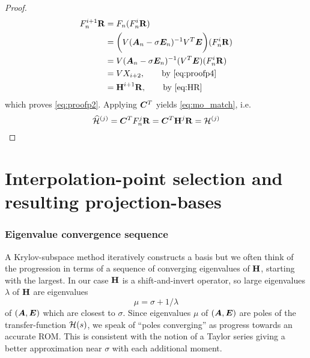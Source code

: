 \begin{proof}
\begin{align*}
F_n^{i+1} \textbf{\textup{R}} &= F_n(F_n^i \textbf{\textup{R}}) \\
&= \bigg( V(\bm{A}_n-\sigma \bm{E}_n)^{-1}V^T \bm{E} \bigg) (F_n^i \textbf{\textup{R}}) \\
&= V  (\bm{A}_n-\sigma \bm{E}_n)^{-1} (V^T \bm{E}) (F_n^i \textbf{\textup{R}})\\
&= V X_{i+2}, \qquad\text{by \eqref{eq:proofp4}}\\
&= \textbf{\textup{H}}^{i+1} \textbf{\textup{R}}, \qquad\text{by \eqref{eq:HR}}
\end{align*}
which proves \eqref{eq:proofp2}.   Applying $\bm{C}^T$ yields \eqref{eq:mo_match}, i.e.
\[
\widehat{\mathcal{H}}^{(j)} = \bm{C}^T F^j_n \textbf{\textup{R}} = \bm{C}^T \textbf{\textup{H}}^j \textbf{\textup{R}} = \mathcal{H}^{(j)}
\] 
\end{proof}


\chapter{Interpolation-point selection and resulting projection-bases}
\label{ch:newstuff1}


\subsection{Eigenvalue convergence sequence}
A Krylov-subspace  method iteratively constructs a basis but we often think of the progression in terms of a sequence of converging eigenvalues of $\textbf{\textup{H}}$, starting with the largest.   In our case $\textbf{\textup{H}}$ is a shift-and-invert operator, so large eigenvalues $\lambda$ of $\textbf{\textup{H}}$ are eigenvalues 
\[
\mu=\sigma + 1/\lambda
\]
 of $(\bm{A},\bm{E})$ which are closest to $\sigma$.   Since eigenvalues $\mu$ of $(\bm{A},\bm{E})$ are poles of the transfer-function $\mathcal{H}(s)$, we speak of ``poles converging''  as progress towards an accurate ROM.   This is consistent with the notion of a Taylor series giving a better approximation near $\sigma$ with each additional moment. 

